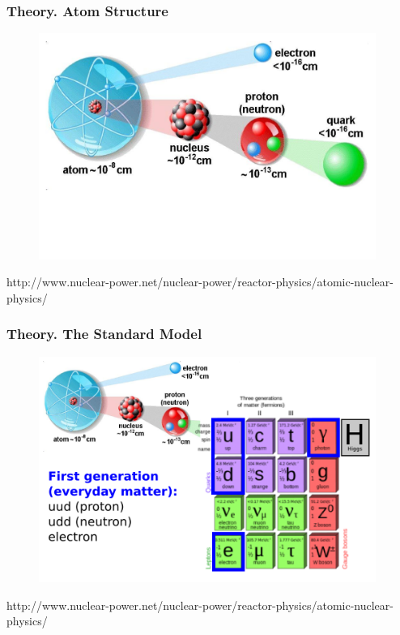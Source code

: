 \begin{frame}\frametitle{Theory. Atom Structure}
\begin{figure}[htb]
  \begin{center}
    \includegraphics[width=0.98\textwidth]{../figs/ForPresentation/Theory_StandardModel01.png}
  \end{center}
\end{figure}
\tiny
http://www.nuclear-power.net/nuclear-power/reactor-physics/atomic-nuclear-physics/
\end{frame}%

\begin{frame}\frametitle{Theory. The Standard Model}
\begin{figure}[htb]
  \begin{center}
    \includegraphics[width=0.98\textwidth]{../figs/ForPresentation/Theory_StandardModel02.png}
  \end{center}
\end{figure}
\tiny
http://www.nuclear-power.net/nuclear-power/reactor-physics/atomic-nuclear-physics/
\end{frame}%

